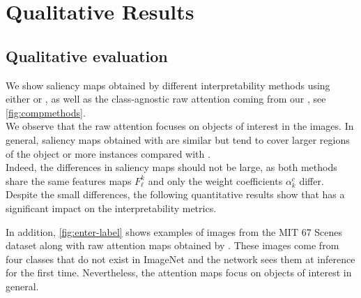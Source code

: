 \section{Qualitative Results}
\label{sec:ca_qual}
\subsection{Qualitative evaluation}
\label{subsec:vinspection}    
We show saliency maps obtained by different interpretability methods using either \gap or \Ours, as 
well as the class-agnostic raw attention coming from our \Ours, see \autoref{fig:compmethods}.\\



We observe that the raw attention focuses on objects of interest in the images. 
In general, saliency maps obtained with \Ours are similar but tend to cover larger regions of the 
object or more instances compared with \gap.\\

Indeed, the differences in saliency maps should not be large, as both methods share the same 
features maps $F^k_\ell$ and only the weight coefficients $\alpha^c_k$ differ.
Despite the small differences, the following quantitative results show that \Ours has a significant 
impact on the interpretability metrics.
   
In addition, \autoref{fig:enter-label} shows examples of images from the MIT 67 Scenes 
dataset \autocite{quattoni2009recognizing} along with raw attention maps obtained by \Ours. These 
images come from four classes that do not exist in ImageNet and the network sees them at inference for 
the first time. Nevertheless, the attention maps focus on objects of interest in general.
    